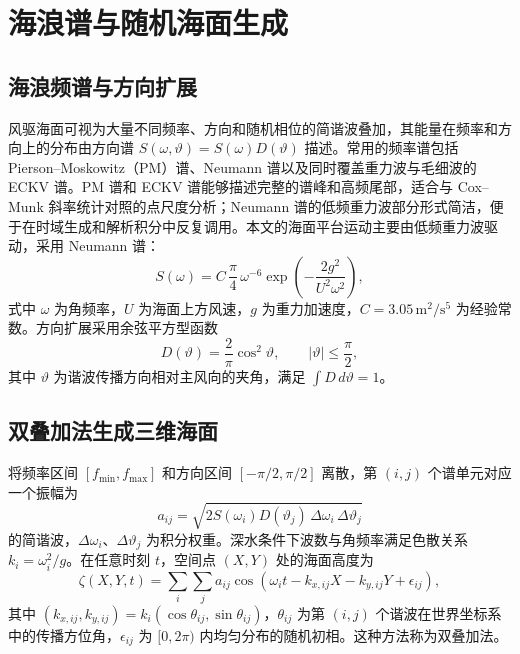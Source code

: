 \section{海浪谱与随机海面生成}
\label{sec:c2_sea}

\subsection{海浪频谱与方向扩展}

风驱海面可视为大量不同频率、方向和随机相位的简谐波叠加，其能量在频率和方向上的分布由方向谱 $S(\omega,\vartheta)=S(\omega)D(\vartheta)$ 描述。常用的频率谱包括 Pierson--Moskowitz（PM）谱、Neumann 谱以及同时覆盖重力波与毛细波的 ECKV 谱。PM 谱和 ECKV 谱能够描述完整的谱峰和高频尾部，适合与 Cox--Munk 斜率统计对照的点尺度分析；Neumann 谱的低频重力波部分形式简洁，便于在时域生成和解析积分中反复调用。本文的海面平台运动主要由低频重力波驱动，采用 Neumann 谱：
\begin{equation}
S(\omega)=C\,\frac{\pi}{4}\,\omega^{-6}\exp\!\left(-\frac{2g^2}{U^2\omega^2}\right),
\label{eq:c2_neumann}
\end{equation}
式中 $\omega$ 为角频率，$U$ 为海面上方风速，$g$ 为重力加速度，$C=3.05\,\mathrm{m^2/s^5}$ 为经验常数。方向扩展采用余弦平方型函数
\begin{equation}
D(\vartheta)=\frac{2}{\pi}\cos^2\vartheta,\qquad |\vartheta|\le\frac{\pi}{2},
\label{eq:c2_spreading}
\end{equation}
其中 $\vartheta$ 为谐波传播方向相对主风向的夹角，满足 $\int D\,d\vartheta=1$。

\subsection{双叠加法生成三维海面}

将频率区间 $[f_{\min},f_{\max}]$ 和方向区间 $[-\pi/2,\pi/2]$ 离散，第 $(i,j)$ 个谱单元对应一个振幅为
\begin{equation}
a_{ij}=\sqrt{2S(\omega_i)D(\vartheta_j)\,\Delta\omega_i\,\Delta\vartheta_j}
\label{eq:c2_amplitude}
\end{equation}
的简谐波，$\Delta\omega_i$、$\Delta\vartheta_j$ 为积分权重。深水条件下波数与角频率满足色散关系 $k_i=\omega_i^2/g$。在任意时刻 $t$，空间点 $(X,Y)$ 处的海面高度为
\begin{equation}
\zeta(X,Y,t)=\sum_{i}\sum_{j}a_{ij}\cos\!\left(\omega_it-k_{x,ij}X-k_{y,ij}Y+\epsilon_{ij}\right),
\label{eq:c2_superposition}
\end{equation}
其中 $(k_{x,ij},k_{y,ij})=k_i(\cos\theta_{ij},\sin\theta_{ij})$，$\theta_{ij}$ 为第 $(i,j)$ 个谐波在世界坐标系中的传播方位角，$\epsilon_{ij}$ 为 $[0,2\pi)$ 内均匀分布的随机初相。这种方法称为双叠加法。

